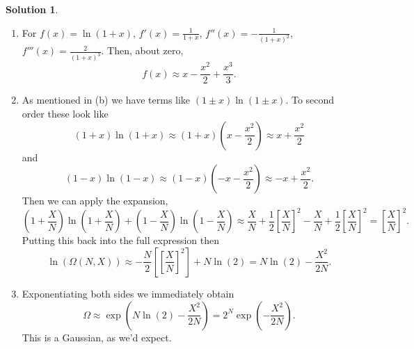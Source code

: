 \documentclass[10pt]{article}
\theoremstyle{definition}
\newtheorem{soln}{Solution}
\begin{document}
\begin{soln}
\begin{enumerate}[label=(\alph*)]
$$              +2\ln(\frac{N}{2})
              \right].$$
          Then we can pull the $2\ln(N/2)$ out of the square brackets and get $-N\ln(N/2)=N\ln(2/N)=N(\ln(2)-\ln(N))$
          so that the two $N\ln(N)$ terms cancel,
          $$-\frac{N}{2}\left[\left(1+\frac{X}{N}\right)\ln(1+\frac{X}{N})+\left(1-\frac{X}{N}\right)\ln(1-\frac{X}{N})\right]+N\ln(2).$$
          Now in the next bit we Taylor expand the terms that look like $(1\pm x)\ln(1\pm x)$.
    \item For $f(x)=\ln(1 + x)$, $f'(x)=\frac{1}{1+x}$, $f''(x)=-\frac{1}{(1+x)^2}$, $f'''(x)=\frac{2}{(1+x)^3}$. Then, about zero,
          $$f(x)\approx x-\frac{x^2}{2}+\frac{x^3}{3}.$$
    \item As mentioned in (b) we have terms like $(1\pm x)\ln(1\pm x)$. To second order these look like
          $$(1+ x)\ln(1+ x)\approx (1+x)\left(x-\frac{x^2}{2}\right)\approx x+\frac{x^2}{2}$$
          and
          $$(1- x)\ln(1- x)\approx (1-x)\left(-x-\frac{x^2}{2}\right)\approx -x+\frac{x^2}{2}.$$
          Then we can apply the expansion,
          $$
            \left(1+\frac{X}{N}\right)\ln(1+\frac{X}{N})+\left(1-\frac{X}{N}\right)\ln(1-\frac{X}{N})
            \approx
            \frac{X}{N}+\frac{1}{2}\left[\frac{X}{N}\right]^2-\frac{X}{N}+\frac{1}{2}\left[\frac{X}{N}\right]^2
            =\left[\frac{X}{N}\right]^2.
          $$
          Putting this back into the full expression then
          $$\ln(\Omega(N,X))\approx -\frac{N}{2}\left[\left[\frac{X}{N}\right]^2\right]+N\ln(2)=N\ln(2)-\frac{X^2}{2N}.$$
    \item Exponentiating both sides we immediately obtain
          $$\Omega\approx \exp(N\ln(2)-\frac{X^2}{2N})=2^N\exp(-\frac{X^2}{2N}).$$
          This is a Gaussian, as we'd expect.
  \end{enumerate}
\end{soln}
\end{document}
